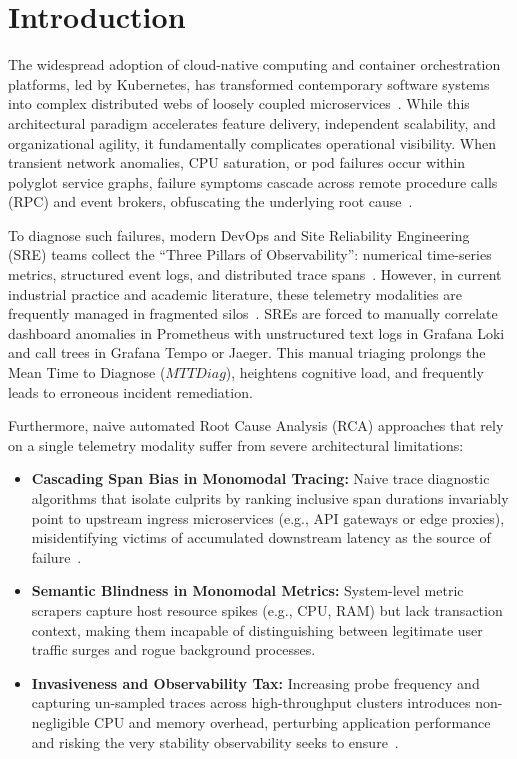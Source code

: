 \section{Introduction}
\label{sec:introduction}

The widespread adoption of cloud-native computing and container orchestration platforms, led by Kubernetes, has transformed contemporary software systems into complex distributed webs of loosely coupled microservices~\cite{gannon_2017, bogner2020microservices}. While this architectural paradigm accelerates feature delivery, independent scalability, and organizational agility, it fundamentally complicates operational visibility. When transient network anomalies, CPU saturation, or pod failures occur within polyglot service graphs, failure symptoms cascade across remote procedure calls (RPC) and event brokers, obfuscating the underlying root cause~\cite{soldani2022anomaly, zhou2021fault}.

To diagnose such failures, modern DevOps and Site Reliability Engineering (SRE) teams collect the ``Three Pillars of Observability'': numerical time-series metrics, structured event logs, and distributed trace spans~\cite{sridharan_2018, beyer2016sre}. However, in current industrial practice and academic literature, these telemetry modalities are frequently managed in fragmented silos~\cite{kosinska_2023, nedelkoski2020selfattentive}. SREs are forced to manually correlate dashboard anomalies in Prometheus with unstructured text logs in Grafana Loki and call trees in Grafana Tempo or Jaeger. This manual triaging prolongs the Mean Time to Diagnose ($MTTDiag$), heightens cognitive load, and frequently leads to erroneous incident remediation.

Furthermore, naive automated Root Cause Analysis (RCA) approaches that rely on a single telemetry modality suffer from severe architectural limitations:
\begin{itemize}[leftmargin=1.2em, itemsep=2pt, topsep=3pt]
    \item \textbf{Cascading Span Bias in Monomodal Tracing:} Naive trace diagnostic algorithms that isolate culprits by ranking inclusive span durations invariably point to upstream ingress microservices (e.g., API gateways or edge proxies), misidentifying victims of accumulated downstream latency as the source of failure~\cite{yu2021microrank}.
    \item \textbf{Semantic Blindness in Monomodal Metrics:} System-level metric scrapers capture host resource spikes (e.g., CPU, RAM) but lack transaction context, making them incapable of distinguishing between legitimate user traffic surges and rogue background processes.
    \item \textbf{Invasiveness and Observability Tax:} Increasing probe frequency and capturing un-sampled traces across high-throughput clusters introduces non-negligible CPU and memory overhead, perturbing application performance and risking the very stability observability seeks to ensure~\cite{vancamp24, valbusa_2025}.
\end{itemize}

